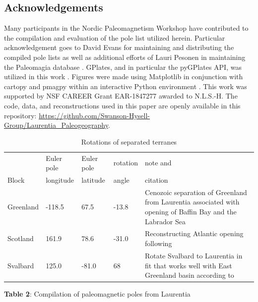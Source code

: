 \documentclass[11pt,letterpaper]{article}
\begin{document}
\subsection*{Acknowledgements}

Many participants in the Nordic Paleomagnetism Workshop have contributed to the compilation and evaluation of the pole list utilized herein. Particular acknowledgement goes to David Evans for maintaining and distributing the compiled pole lists as well as additional efforts of Lauri Pesonen in maintaining the Paleomagia database \citep{Veikkolainen2014a}. GPlates, and in particular the pyGPlates API, was utilized in this work \citep{Muller2018b}. Figures were made using Matplotlib \citep{Hunter2007a} in conjunction with cartopy \citep{Met-Office2010a} and pmagpy \citep{Tauxe2016a} within an interactive Python environment \citep{Perez2007a}. This work was supported by NSF CAREER Grant EAR-1847277 awarded to N.L.S.-H. The code, data, and reconstructions used in this paper are openly available in this repository: \url{https://github.com/Swanson-Hysell-Group/Laurentia_Paleogeography}. 


\footnotesize


\begin{table}[hbt]
\caption{Rotations of separated terranes}
{\scriptsize
\begin{tabular}{|l|l|l|l|p{2 in}|}
  \hline
& Euler pole & Euler pole & rotation & note and \\
Block & longitude & latitude & angle & citation \\
\hline
Greenland & -118.5 & 67.5 & -13.8 & Cenozoic separation of Greenland from Laurentia associated with opening of Baffin Bay and the Labrador Sea \citep{Roest1989a} \\
\hline
Scotland & 161.9 & 78.6 & -31.0 & Reconstructing Atlantic opening following \cite{Torsvik2017a} \\
\hline
Svalbard & 125.0 & -81.0 & 68 & Rotate Svalbard to Laurentia in fit that works well with East Greenland basin according to \cite{Maloof2006a}\\
\hline
\end{tabular}
}
\label{tab:terrane_rotations}
\end{table}

\newpage

{\scriptsize
\begin{landscape}
\textbf{Table 2}: Compilation of paleomagnetic poles from Laurentia

\end{landscape}
}
\end{document}
